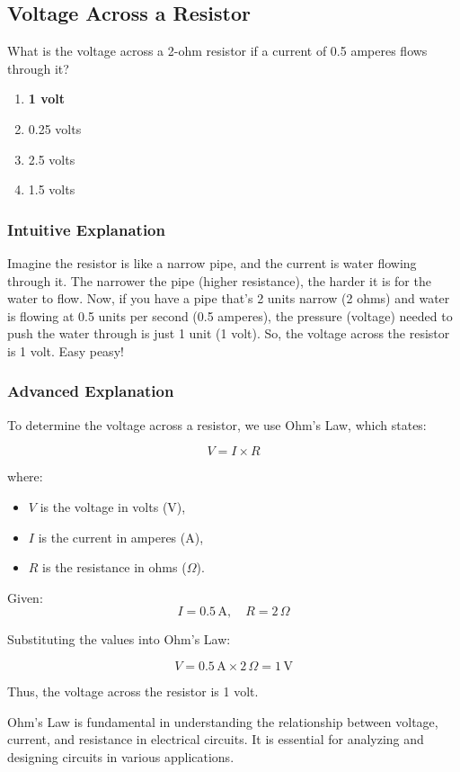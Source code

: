 \subsection{Voltage Across a Resistor}
\label{T5D10}

\begin{tcolorbox}[colback=gray!10!white,colframe=black!75!black,title=T5D10]
What is the voltage across a 2-ohm resistor if a current of 0.5 amperes flows through it?
\begin{enumerate}[label=\Alph*)]
    \item \textbf{1 volt}
    \item 0.25 volts
    \item 2.5 volts
    \item 1.5 volts
\end{enumerate}
\end{tcolorbox}

\subsubsection{Intuitive Explanation}
Imagine the resistor is like a narrow pipe, and the current is water flowing through it. The narrower the pipe (higher resistance), the harder it is for the water to flow. Now, if you have a pipe that's 2 units narrow (2 ohms) and water is flowing at 0.5 units per second (0.5 amperes), the pressure (voltage) needed to push the water through is just 1 unit (1 volt). So, the voltage across the resistor is 1 volt. Easy peasy!

\subsubsection{Advanced Explanation}
To determine the voltage across a resistor, we use Ohm's Law, which states:

\[
V = I \times R
\]

where:
\begin{itemize}
    \item \( V \) is the voltage in volts (V),
    \item \( I \) is the current in amperes (A),
    \item \( R \) is the resistance in ohms (\(\Omega\)).
\end{itemize}

Given:
\[
I = 0.5 \, \text{A}, \quad R = 2 \, \Omega
\]

Substituting the values into Ohm's Law:

\[
V = 0.5 \, \text{A} \times 2 \, \Omega = 1 \, \text{V}
\]

Thus, the voltage across the resistor is 1 volt.

Ohm's Law is fundamental in understanding the relationship between voltage, current, and resistance in electrical circuits. It is essential for analyzing and designing circuits in various applications.

